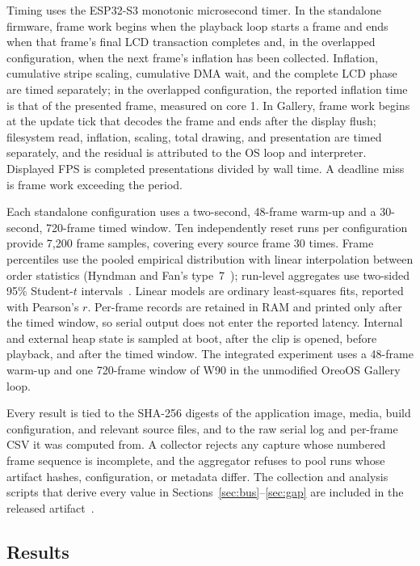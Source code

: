 \documentclass[11pt,twocolumn]{article}
\begin{document}
Timing uses the ESP32-S3 monotonic microsecond timer.  In the standalone
firmware, frame work begins when the playback loop starts a frame and ends
when that frame's final LCD transaction completes and, in the overlapped
configuration, when the next frame's inflation has been collected.
Inflation, cumulative stripe scaling, cumulative DMA wait, and the complete
LCD phase are timed separately; in the overlapped configuration, the
reported inflation time is that of the presented frame, measured on core 1.
In Gallery, frame work begins at the update tick that decodes the frame and
ends after the display flush; filesystem read, inflation, scaling, total
drawing, and presentation are timed separately, and the residual is
attributed to the OS loop and interpreter.  Displayed FPS is completed
presentations divided by wall time.  A deadline miss is frame work exceeding
the period.

Each standalone configuration uses a two-second, 48-frame warm-up and a
30-second, 720-frame timed window.  Ten independently reset runs per
configuration provide 7,200 frame samples, covering every source frame 30
times.  Frame percentiles use the pooled empirical distribution with linear
interpolation between order statistics (Hyndman and Fan's
type~7~\cite{hyndman1996sample}); run-level aggregates use two-sided 95\%
Student-$t$ intervals~\cite{student1908probable}.  Linear models are ordinary
least-squares fits, reported with Pearson's $r$.  Per-frame records are
retained in RAM and printed only after the timed window, so serial output
does not enter the reported latency.  Internal and external heap state is
sampled at boot, after the clip is opened, before playback, and after the
timed window.  The integrated experiment uses a 48-frame warm-up and one
720-frame window of W90 in the unmodified OreoOS Gallery loop.

Every result is tied to the SHA-256 digests of the application image,
media, build configuration, and relevant source files, and to the raw serial
log and per-frame CSV it was computed from.  A collector rejects any capture
whose numbered frame sequence is incomplete, and the aggregator refuses to
pool runs whose artifact hashes, configuration, or metadata differ.  The
collection and analysis scripts that derive every value in
Sections~\ref{sec:bus}--\ref{sec:gap} are included in the released
artifact~\cite{bhattacharya2026oreo}.

\subsection{Results}
\label{sec:standalone-results}
\end{document}
